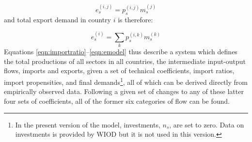 \documentclass[a4paper]{article}
\begin{document}
\begin{equation}
e_s^{(i,j)} = p_s^{(i,j)}m_s^{(j)}
\end{equation}
and total export demand in country $i$ is therefore:

\begin{equation}\label{eqn:emodel}
e_s^{(i)} = \sum_k{p_s^{(i,k)}m_s^{(k)}}
\end{equation}
Equations \eqref{eqn:importratio}--\eqref{eqn:emodel} thus describe a system which defines the total productions of all sectors in all countries, the intermediate input-output flows, imports and exports, given a set of technical coefficients, import ratios, import propensities, and final demands\footnote{In the present version of the model, investments, $n_s$, are set to zero. 
Data on investments is provided by WIOD but it is not used in this version.}, all of which can be derived directly from empirically observed data.
Following a given set of changes to any of these latter four sets of coefficients, all of the former six categories of flow can be found.
\end{document}
